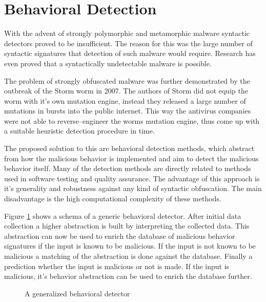 \section{Behavioral Detection}
With the advent of strongly polymorphic and metamorphic malware syntactic detectors proved to be insufficient. The reason for this was the large number of syntactic signatures that detection of such malware would require. Research has even proved that a syntactically undetectable malware is possible\cite{Filiol07}. 

The problem of strongly obfuscated malware was further demonstrated by the outbreak of the Storm worm in 2007. The authors of Storm did not equip the worm with it's own mutation engine, instead they released a large number of mutations in bursts into the public internet. This way the antivirus companies were not able to reverse--engineer the worms mutation engine, thus come up with a suitable heuristic detection procedure in time.

The proposed solution to this are behavioral detection methods, which abstract from how the malicious behavior is implemented and aim to detect the malicious behavior itself. Many of the detection methods are directly related to methods used in software testing and quality assurance. The advantage of this approach is it's generality and robustness against any kind of syntactic obfuscation. The main disadvantage is the high computational complexity of these methods. 

Figure \ref{fig_gen_behav_detector} shows a schema of a generic behavioral detector. After initial data collection a higher abstraction is built by interpreting the collected data. This abstraction can now be used to enrich the database of malicious behavior signatures if the input is known to be malicious. If the input is not known to be malicious a matching of the abstraction is done against the database. Finally a prediction whether the input is malicious or not is made. If the input is malicious, it's behavior abstraction can be used to enrich the database further.

\begin{figure}[H]
    \centering
    \caption{A generalized behavioral detector}
    \label{fig_gen_behav_detector}
\end{figure}

